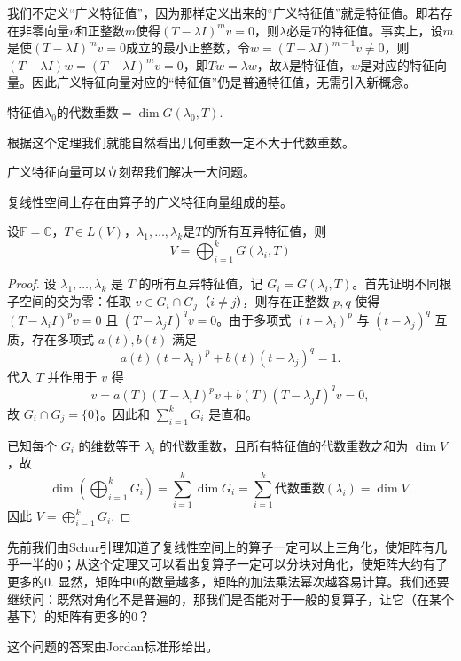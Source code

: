 我们不定义“广义特征值”，因为那样定义出来的“广义特征值”就是特征值。即若存在非零向量$v$和正整数$m$使得$(T - \lambda I)^m v = 0$，则$\lambda$必是$T$的特征值。事实上，设$m$是使$(T - \lambda I)^m v = 0$成立的最小正整数，令$w = (T - \lambda I)^{m-1}v \neq 0$，则$(T - \lambda I)w = (T - \lambda I)^m v = 0$，即$Tw = \lambda w$，故$\lambda$是特征值，$w$是对应的特征向量。因此广义特征向量对应的“特征值”仍是普通特征值，无需引入新概念。
\begin{theorem}
特征值$\lambda_0$的代数重数$=\dim G(\lambda_0, T)$.
\end{theorem}
根据这个定理我们就能自然看出几何重数一定不大于代数重数。

广义特征向量可以立刻帮我们解决一大问题。
\begin{theorem}
复线性空间上存在由算子的广义特征向量组成的基。
\end{theorem}

\begin{theorem}[根子空间分解]
设$\mathbb{F}=\mathbb{C}$，$T \in L(V)$，$\lambda_1, \ldots, \lambda_k$是$T$的所有互异特征值，则
\[
V = \bigoplus_{i=1}^k G(\lambda_i, T)
\]
\end{theorem}

\begin{proof}
设 $\lambda_1, \ldots, \lambda_k$ 是 $T$ 的所有互异特征值，记 $G_i = G(\lambda_i, T)$。首先证明不同根子空间的交为零：任取 $v \in G_i \cap G_j$（$i \neq j$），则存在正整数 $p, q$ 使得 $(T - \lambda_i I)^p v = 0$ 且 $(T - \lambda_j I)^q v = 0$。由于多项式 $(t - \lambda_i)^p$ 与 $(t - \lambda_j)^q$ 互质，存在多项式 $a(t), b(t)$ 满足
\[
a(t)(t - \lambda_i)^p + b(t)(t - \lambda_j)^q = 1.
\]
代入 $T$ 并作用于 $v$ 得
\[
v = a(T)(T - \lambda_i I)^p v + b(T)(T - \lambda_j I)^q v = 0,
\]
故 $G_i \cap G_j = \{0\}$。因此和 $\sum_{i=1}^k G_i$ 是直和。

已知每个 $G_i$ 的维数等于 $\lambda_i$ 的代数重数，且所有特征值的代数重数之和为 $\dim V$，故
\[
\dim\left(\bigoplus_{i=1}^k G_i\right) = \sum_{i=1}^k \dim G_i = \sum_{i=1}^k \text{代数重数}(\lambda_i) = \dim V.
\]
因此 $V = \bigoplus_{i=1}^k G_i$.
\end{proof}

先前我们由Schur引理知道了复线性空间上的算子一定可以上三角化，使矩阵有几乎一半的0；从这个定理又可以看出复算子一定可以分块对角化，使矩阵大约有了更多的0. 显然，矩阵中0的数量越多，矩阵的加法乘法幂次越容易计算。我们还要继续问：既然对角化不是普遍的，那我们是否能对于一般的复算子，让它（在某个基下）的矩阵有更多的0？

这个问题的答案由Jordan标准形给出。


